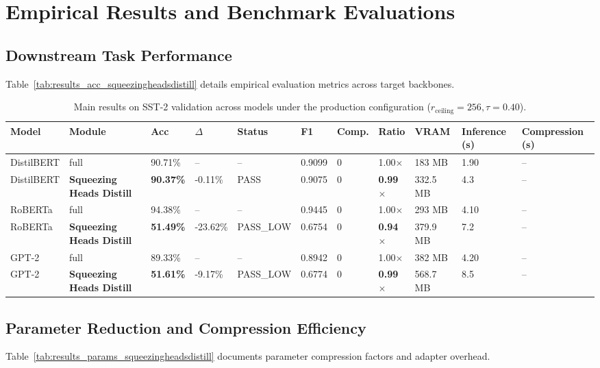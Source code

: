 \section{Empirical Results and Benchmark Evaluations}

\subsection{Downstream Task Performance}
Table~\ref{tab:results_acc_squeezingheadsdistill} details empirical evaluation metrics across target backbones.

\begin{table}[t]
\centering
\small
\begin{tabular}{lllllllllll}
\toprule
\textbf{Model} & \textbf{Module} & \textbf{Acc} & \textbf{$\Delta$} & \textbf{Status} & \textbf{F1} & \textbf{Comp.} & \textbf{Ratio} & \textbf{VRAM} & \textbf{Inference (s)} & \textbf{Compression (s)} \\
\midrule
DistilBERT & full & 90.71\% & -- & -- & 0.9099 & 0 & 1.00$\times$ & 183 MB & 1.90 & -- \\
DistilBERT & \textbf{Squeezing Heads Distill} & \textbf{90.37\%} & -0.11\% & PASS & 0.9075 & 0 & \textbf{0.99$\times$} & 332.5 MB & 4.3 & -- \\
RoBERTa & full & 94.38\% & -- & -- & 0.9445 & 0 & 1.00$\times$ & 293 MB & 4.10 & -- \\
RoBERTa & \textbf{Squeezing Heads Distill} & \textbf{51.49\%} & -23.62\% & PASS\_LOW & 0.6754 & 0 & \textbf{0.94$\times$} & 379.9 MB & 7.2 & -- \\
GPT-2 & full & 89.33\% & -- & -- & 0.8942 & 0 & 1.00$\times$ & 382 MB & 4.20 & -- \\
GPT-2 & \textbf{Squeezing Heads Distill} & \textbf{51.61\%} & -9.17\% & PASS\_LOW & 0.6774 & 0 & \textbf{0.99$\times$} & 568.7 MB & 8.5 & -- \\
\bottomrule
\end{tabular}
\caption{Main results on SST-2 validation across models under the production configuration ($r_{\mathrm{ceiling}}=256, \tau=0.40$).}
\label{tab:main_sst2}
\end{table}

\subsection{Parameter Reduction and Compression Efficiency}
Table~\ref{tab:results_params_squeezingheadsdistill} documents parameter compression factors and adapter overhead.

